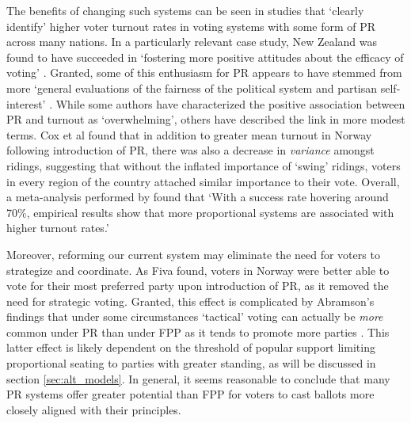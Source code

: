 

The benefits of changing such systems can be seen in studies that `clearly identify' higher voter turnout rates in voting systems with some form of PR\citep{Blais_1990} across many nations.
In a particularly relevant case study, New Zealand was found to have succeeded in `fostering more positive attitudes about the efficacy of voting' \citep{Karp_Banducci}. Granted, some of this enthusiasm for PR appears to have stemmed from more `general evaluations of the fairness of the political system and partisan self-interest' \citep{Banducci_Karp}.
While some authors have characterized the positive association between PR and turnout as `overwhelming'\citep{Selb}, others have described the link in more modest terms.
Cox et al found that in addition to greater mean turnout in Norway following introduction of PR, there was also a decrease in \emph{variance} amongst ridings, suggesting that without the inflated importance of `swing' ridings, voters in every region of the country attached similar importance to their vote\citep{Cox_2016}.
Overall, a meta-analysis performed by \citet{Geys_2006} found that `With a success rate hovering around 70\%, empirical results show that more proportional systems are associated with higher turnout rates.'

Moreover, reforming our current system may eliminate the need for voters to strategize and coordinate.
As Fiva found, voters in Norway were better able to vote for their most preferred party upon introduction of PR, as it removed the need for strategic voting\citep{Fiva}.
Granted, this effect is complicated by Abramson's findings that under some circumstances `tactical' voting can actually be \emph{more} common under PR than under FPP as it tends to promote more parties \citep{Abramson_2010}.
This latter effect is likely dependent on the threshold of popular support limiting proportional seating to parties with greater standing, as will be discussed in section \ref{sec:alt_models}.
In general, it seems reasonable to conclude that many PR systems offer greater potential than FPP for voters to cast ballots more closely aligned with their principles.

